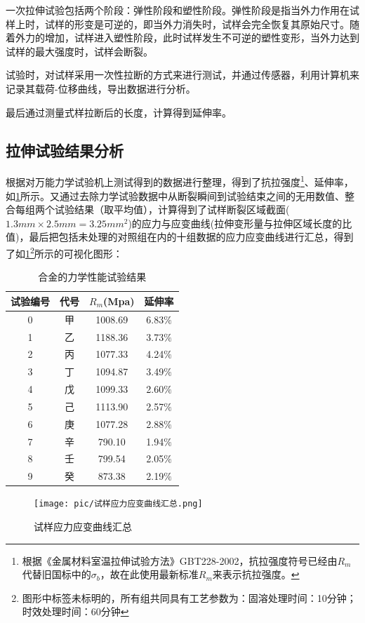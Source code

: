 一次拉伸试验包括两个阶段：弹性阶段和塑性阶段。弹性阶段是指当外力作用在试样上时，试样的形变是可逆的，即当外力消失时，试样会完全恢复其原始尺寸。随着外力的增加，试样进入塑性阶段，此时试样发生不可逆的塑性变形，当外力达到试样的最大强度时，试样会断裂。

试验时，对试样采用一次性拉断的方式来进行测试，并通过传感器，利用计算机来记录其载荷-位移曲线，导出数据进行分析。

最后通过测量式样拉断后的长度，计算得到延伸率。

\subsection{拉伸试验结果分析}
根据对万能力学试验机上测试得到的数据进行整理，得到了抗拉强度\footnote{根据《金属材料室温拉伸试验方法》GBT228-2002，抗拉强度符号已经由$ R_m $代替旧国标中的$ \sigma_b $，故在此使用最新标准$ R_m $来表示抗拉强度。}、延伸率，如\ref{sec:mystrength}所示。又通过去除力学试验数据中从断裂瞬间到试验结束之间的无用数值、整合每组两个试验结果（取平均值），计算得到了试样断裂区域截面($ 1.3mm\times2.5mm=3.25mm^2 $)的应力与应变曲线(拉伸变形量与拉伸区域长度的比值)，最后把包括未处理的对照组在内的十组数据的应力应变曲线进行汇总，得到了如\ref{fig:试样应力应变曲线汇总}\footnote{图形中标签未标明的，所有组共同具有工艺参数为：固溶处理时间：10分钟；时效处理时间：60分钟}所示的可视化图形：
\begin{table}[htbp]
	\centering
	\caption{\ti 合金的力学性能试验结果}
	\label{sec:mystrength}
	\begin{tabular}{cccc}
		\toprule
		试验编号& 代号&$ R_m $(Mpa)&延伸率 \\
		\midrule
		0 & 甲 & 1008.69 & 6.83$\%$ \\
		1 & 乙 & 1188.36 & 3.73$\%$ \\
		2 & 丙 & 1077.33 & 4.24$\%$ \\
		3 & 丁 & 1094.87 & 3.49$\%$ \\
		4 & 戊 & 1099.33 & 2.60$\%$ \\
		5 & 己 & 1113.90 & 2.57$\%$ \\
		6 & 庚 & 1077.28 & 2.88$\%$ \\
		7 & 辛 & 790.10 & 1.94$\%$ \\
		8 & 壬 & 799.54 & 2.05$\%$ \\
		9 & 癸 & 873.38 & 2.19$\%$ \\
		\bottomrule
	\end{tabular}
\end{table}
\begin{figure}[h!]
	\centering
	\texttt{[image: pic/试样应力应变曲线汇总.png]}
	\caption{试样应力应变曲线汇总}
	\label{fig:试样应力应变曲线汇总}
\end{figure}
